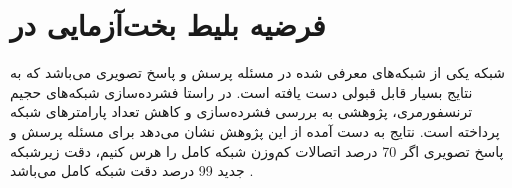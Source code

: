 \section{فرضیه بلیط بخت‌آزمایی در 
	}
شبکه
\cite{chen2020uniter}
یکی از شبکه‌های معرفی شده در مسئله پرسش و پاسخ تصویری می‌باشد که به نتایج بسیار قابل قبولی دست یافته است. در راستا فشرده‌سازی شبکه‌های حجیم ترنسفورمری، پژوهشی به بررسی فشرده‌سازی و کاهش تعداد پارامتر‌های شبکه
پرداخته است. نتایج به دست آمده از این پژوهش نشان می‌دهد برای مسئله پرسش و پاسخ تصویری اگر 70 درصد اتصالات کم‌وزن شبکه کامل 
را هرس کنیم، دقت زیر‌شبکه جدید 99 درصد دقت شبکه کامل می‌باشد \cite{gan2021playing}.

